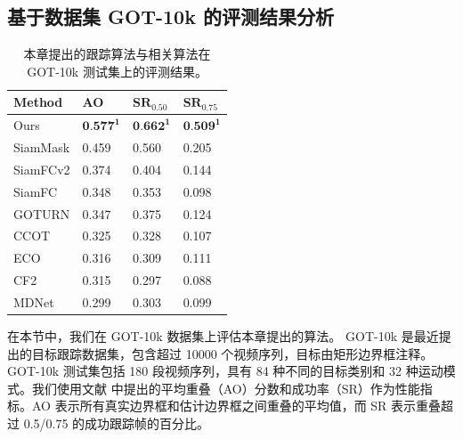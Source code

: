 
\subsection{基于数据集 GOT-10k 的评测结果分析}
\begin{table}[t]
\centering
\caption{本章提出的跟踪算法与相关算法在 GOT-10k \cite{GOT-10k} 测试集上的评测结果。}
\begin{tabular}{l l l l}
\bottomrule
Method   &  AO   &  $\textbf{SR}_{0.50}$ & $\textbf{SR}_{0.75}$  \\
\hline
Ours &  $\textbf{0.577}^\textbf{1}$ & $\textbf{0.662}^\textbf{1}$  & $\textbf{0.509}^\textbf{1}$  \\
SiamMask &  0.459&  0.560 &0.205 \\
SiamFCv2 &  0.374&  0.404 &0.144 \\
SiamFC   &  0.348&  0.353 &0.098 \\
GOTURN	 &  0.347&  0.375 &0.124 \\
CCOT	 &  0.325&  0.328 &0.107 \\
ECO	     &  0.316&  0.309 &0.111 \\
CF2	     &  0.315&  0.297 &0.088 \\
MDNet	 &  0.299&  0.303 &0.099 \\
\bottomrule
\end{tabular}
\label{table:end_got10k}
\end{table}
在本节中，我们在 GOT-10k \cite{GOT-10k} 数据集上评估本章提出的算法。
GOT-10k 是最近提出的目标跟踪数据集，包含超过 10000 个视频序列，目标由矩形边界框注释。
GOT-10k 测试集包括 180 段视频序列，具有 84 种不同的目标类别和 32 种运动模式。我们使用文献 \cite{GOT-10k} 中提出的平均重叠（AO）分数和成功率（SR）作为性能指标。AO 表示所有真实边界框和估计边界框之间重叠的平均值，而 SR 表示重叠超过 0.5/0.75 的成功跟踪帧的百分比。

